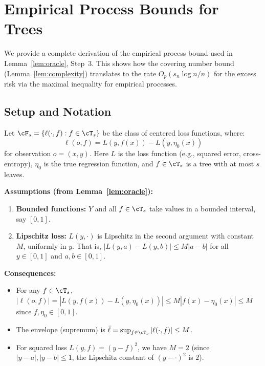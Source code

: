 
\section{Empirical Process Bounds for Trees}
\label{app:empirical-process}

We provide a complete derivation of the empirical process bound used in Lemma~\ref{lem:oracle}, Step~3. This shows how the covering number bound (Lemma~\ref{lem:complexity}) translates to the rate $O_p(s_n \log n / n)$ for the excess risk via the maximal inequality for empirical processes.

\subsection{Setup and Notation}

Let $\cF_s = \{ \ell(\cdot, f) : f \in \cT_s \}$ be the class of centered loss functions, where:
\[
\ell(o, f) = L(y, f(x)) - L(y, \eta_0(x))
\]
for observation $o = (x,y)$. Here $L$ is the loss function (e.g., squared error, cross-entropy), $\eta_0$ is the true regression function, and $f \in \cT_s$ is a tree with at most $s$ leaves.

\textbf{Assumptions (from Lemma~\ref{lem:oracle}):}
\begin{enumerate}
\item \textbf{Bounded functions:} $Y$ and all $f \in \cT_s$ take values in a bounded interval, say $[0,1]$.
\item \textbf{Lipschitz loss:} $L(y, \cdot)$ is Lipschitz in the second argument with constant $M$, uniformly in $y$. That is, $|L(y, a) - L(y, b)| \le M |a - b|$ for all $y \in [0,1]$ and $a, b \in [0,1]$.
\end{enumerate}

\textbf{Consequences:}
\begin{itemize}
\item For any $f \in \cT_s$, $|\ell(o, f)| = |L(y, f(x)) - L(y, \eta_0(x))| \le M |f(x) - \eta_0(x)| \le M$ since $f, \eta_0 \in [0,1]$.
\item The envelope (supremum) is $\bar{\ell} = \sup_{f \in \cT_s} |\ell(\cdot, f)| \le M$.
\item For squared loss $L(y, f) = (y - f)^2$, we have $M = 2$ (since $|y - a|, |y - b| \le 1$, the Lipschitz constant of $(y - \cdot)^2$ is $2$).
\end{itemize}

